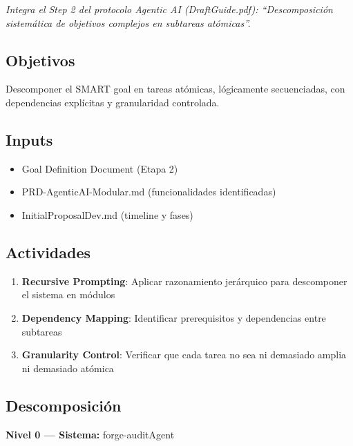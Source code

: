 \documentclass[12pt,a4paper]{article}
\begin{document}
\emph{Integra el Step 2 del protocolo Agentic AI (DraftGuide.pdf): ``Descomposición sistemática de objetivos complejos en subtareas atómicas''.}

\subsection*{Objetivos}
Descomponer el SMART goal en tareas atómicas, lógicamente secuenciadas, con dependencias explícitas y granularidad controlada.

\subsection*{Inputs}
\begin{itemize}
  \item Goal Definition Document (Etapa 2)
  \item PRD-AgenticAI-Modular.md (funcionalidades identificadas)
  \item InitialProposalDev.md (timeline y fases)
\end{itemize}

\subsection*{Actividades}
\begin{enumerate}
  \item \textbf{Recursive Prompting}: Aplicar razonamiento jerárquico para descomponer el sistema en módulos
  \item \textbf{Dependency Mapping}: Identificar prerequisitos y dependencias entre subtareas
  \item \textbf{Granularity Control}: Verificar que cada tarea no sea ni demasiado amplia ni demasiado atómica
\end{enumerate}

\subsection*{Descomposición}

\textbf{Nivel 0 --- Sistema:} forge-auditAgent
\end{document}
